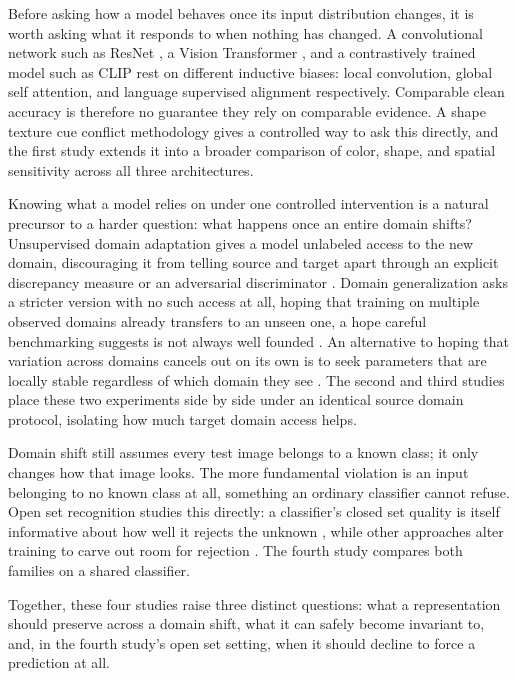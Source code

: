 \documentclass{article}
\begin{document}
Before asking how a model behaves once its input distribution changes, it
is worth asking what it responds to when nothing has changed. A
convolutional network such as ResNet \citep{he2016deep}, a Vision
Transformer \citep{dosovitskiy2021image}, and a contrastively trained model
such as CLIP \citep{radford2021learning} rest on different inductive
biases: local convolution, global self attention, and language supervised
alignment respectively. Comparable clean accuracy is therefore no guarantee
they rely on comparable evidence. A shape texture cue conflict
methodology \citep{geirhos2019imagenettrained} gives a controlled way to
ask this directly, and the first study extends it into a
broader comparison of color, shape, and spatial sensitivity across all
three architectures.

Knowing what a model relies on under one controlled intervention is a
natural precursor to a harder question: what happens once an entire
domain shifts? Unsupervised domain adaptation gives a model
unlabeled access to the new domain, discouraging it from telling source
and target apart through an explicit discrepancy measure
\citep{long2015learning} or an adversarial discriminator
\citep{ganin2016domainadversarial,long2018conditional}. Domain
generalization asks a stricter version with no such access at all, hoping
that training on multiple observed domains already transfers to an unseen
one, a hope careful benchmarking suggests is not always well founded
\citep{gulrajani2021search}. An alternative to hoping that variation
across domains cancels out on its own is to seek parameters that are
locally stable regardless of which domain they see
\citep{foret2021sharpnessaware}. The second and third studies place these
two experiments side by side under an identical source domain protocol,
isolating how much target domain access helps.

Domain shift still assumes every test image belongs to a known class; it
only changes how that image looks. The more fundamental violation is an
input belonging to no known class at all, something an ordinary classifier
cannot refuse. Open set recognition studies this directly: a classifier's
closed set quality is itself informative about how well it rejects the
unknown \citep{vaze2022openset}, while other approaches alter training to
carve out room for rejection \citep{zhou2021learning}. The fourth study
compares both families on a shared classifier.

Together, these four studies raise three distinct questions: what a
representation should preserve across a domain shift, what it can safely
become invariant to, and, in the fourth study's open set setting, when it
should decline to force a prediction at all.
\end{document}
